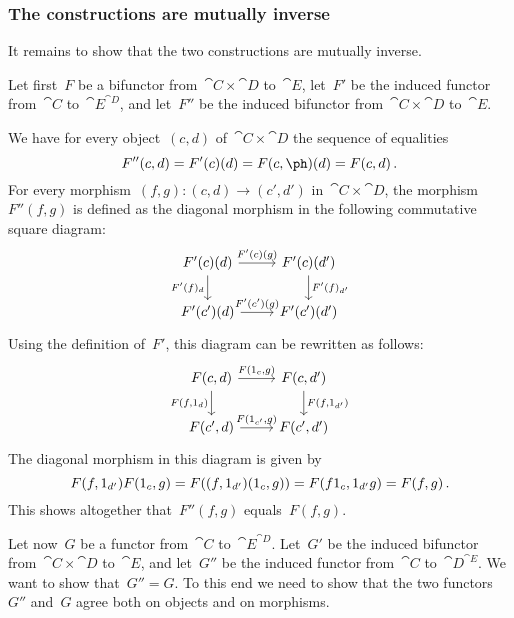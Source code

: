 \subsubsection*{The constructions are mutually inverse}

It remains to show that the two constructions are mutually inverse.

Let first~$F$ be a bifunctor from~$\cat{C} × \cat{D}$ to~$\cat{E}$, let~$F'$ be the induced functor from~$\cat{C}$ to~$\cat{E}^{\cat{D}}$, and let~$F''$ be the induced bifunctor from~$\cat{C} × \cat{D}$ to~$\cat{E}$.

We have for every object~$(c, d)$ of~$\cat{C} × \cat{D}$ the sequence of equalities
\[
	F''(c, d)
	=
	F'(c)(d)
	=
	F(c, \ph)(d)
	=
	F(c, d) \,.
\]
For every morphism~$(f, g) \colon (c, d) \to (c', d')$ in~$\cat{C} × \cat{D}$, the morphism~$F''(f, g)$ is defined as the diagonal morphism in the following commutative square diagram:
\[
	\begin{tikzcd}
		F'(c)(d)
		\arrow{r}[above]{F'(c)(g)}
		\arrow{d}[left]{F'(f)_d}
		&
		F'(c)(d')
		\arrow{d}[right]{F'(f)_{d'}}
		\\
		F'(c')(d)
		\arrow{r}[above]{F'(c')(g)}
		&
		F'(c')(d')
	\end{tikzcd}
\]
Using the definition of~$F'$, this diagram can be rewritten as follows:
\[
	\begin{tikzcd}
		F(c, d)
		\arrow{r}[above]{F(\id_c, g)}
		\arrow{d}[left]{F(f, \id_d)}
		&
		F(c, d')
		\arrow{d}[right]{F(f, \id_{d'})}
		\\
		F(c', d)
		\arrow{r}[above]{F(\id_{c'}, g)}
		&
		F(c', d')
	\end{tikzcd}
\]
The diagonal morphism in this diagram is given by
\[
	F(f, 1_{d'}) F(1_c, g)
	=
	F((f, 1_{d'}) (1_c, g))
	=
	F(f 1_c, 1_{d'} g)
	=
	F(f, g) \,.
\]
This shows altogether that~$F''(f, g)$ equals~$F(f, g)$.

Let now~$G$ be a functor from~$\cat{C}$ to~$\cat{E}^{\cat{D}}$.
Let~$G'$ be the induced bifunctor from~$\cat{C} × \cat{D}$ to~$\cat{E}$, and let~$G''$ be the induced functor from~$\cat{C}$ to~$\cat{D}^{\cat{E}}$.
We want to show that~$G'' = G$.
To this end we need to show that the two functors~$G''$ and~$G$ agree both on objects and on morphisms.

